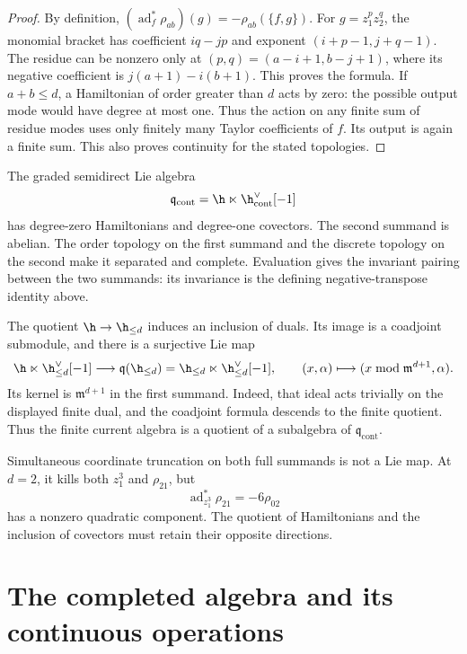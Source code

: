 \begin{proof}
By definition,
$(\operatorname{ad}_f^*\rho_{ab})(g)=-\rho_{ab}(\{f,g\})$.
For $g=z_1^pz_2^q$, the monomial bracket has coefficient $iq-jp$
and exponent $(i+p-1,j+q-1)$. The residue can be nonzero only at
$(p,q)=(a-i+1,b-j+1)$, where its negative coefficient is
$j(a+1)-i(b+1)$. This proves the formula.
If $a+b\leq d$, a Hamiltonian of order greater than $d$ acts by
zero: the possible output mode would have degree at most one.
Thus the action on any finite sum of residue modes uses only
finitely many Taylor coefficients of $f$. Its output is again a
finite sum. This also proves continuity for the stated topologies.
\end{proof}

The graded semidirect Lie algebra
\[
 \mathfrak q_{\mathrm{cont}}
   =\h\ltimes\h^\vee_{\mathrm{cont}}[-1]
\]
has degree-zero Hamiltonians and degree-one covectors. The second
summand is abelian. The order topology on the first summand and the
discrete topology on the second make it separated and complete.
Evaluation gives the invariant pairing between the two summands:
its invariance is the defining negative-transpose identity above.

The quotient $\h\to\h_{\leq d}$ induces an inclusion of duals.
Its image is a coadjoint submodule, and there is a surjective Lie map
\begin{equation}\label{eq:vol2-current-subquotient}
 \h\ltimes\h_{\leq d}^\vee[-1]
   \longrightarrow
 \mathfrak q(\h_{\leq d})
   =\h_{\leq d}\ltimes\h_{\leq d}^\vee[-1],
 \qquad (x,\alpha)\longmapsto(x\bmod\mathfrak m^{d+1},\alpha).
\end{equation}
Its kernel is $\mathfrak m^{d+1}$ in the first summand. Indeed,
that ideal acts trivially on the displayed finite dual, and the
coadjoint formula descends to the finite quotient. Thus the finite
current algebra is a quotient of a subalgebra of
$\mathfrak q_{\mathrm{cont}}$.

Simultaneous coordinate truncation on both full summands is not a
Lie map. At $d=2$, it kills both $z_1^3$ and $\rho_{21}$, but
\[
 \operatorname{ad}_{z_1^3}^*\rho_{21}=-6\rho_{02}
\]
has a nonzero quadratic component. The quotient of Hamiltonians and
the inclusion of covectors must retain their opposite directions.

\section{The completed algebra and its continuous operations}

